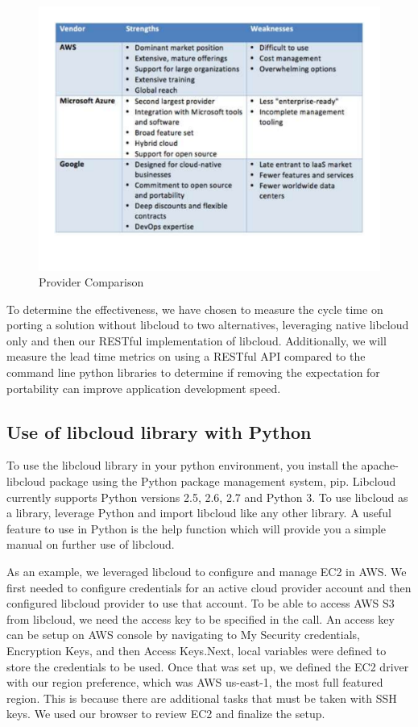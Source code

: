 \begin{figure}[!ht]
  \centering
  \includegraphics[width=\columnwidth]{images/aws-azure-google.pdf}
  \caption{Provider Comparison}\label{F:comparison}
\end{figure}

To determine the effectiveness, we have chosen to measure the cycle time on porting a 
solution without libcloud to two alternatives, leveraging native libcloud only and then 
our RESTful implementation of libcloud. Additionally, we will measure the lead time 
metrics on using a RESTful API compared to the command line python libraries to determine
if removing the expectation for portability can improve application development speed.

\subsection{Use of libcloud library with Python}

To use the libcloud library in your python environment, you install the apache-libcloud 
package using the Python package management system, pip. Libcloud currently supports Python
versions 2.5, 2.6, 2.7 and Python 3. To use libcloud as a library,
leverage Python and import libcloud like any other library. A useful feature to use in 
Python is the help function which will provide you a simple 
manual on further use of libcloud.

As an example, we leveraged libcloud to configure and manage EC2 in AWS. We first needed 
to configure credentials for an active cloud provider account and then configured 
libcloud provider to use that account. To be able to access AWS S3 from libcloud, we need 
the access key to be specified in the call. An access key can be setup on AWS console by 
navigating to My Security credentials, Encryption Keys, and then Access Keys.Next, local 
variables were defined to store the credentials to be used. Once that was set up, we 
defined the EC2  driver with our region preference, which was AWS us-east-1, the most 
full featured region. This is because there are additional tasks that must be taken with 
SSH keys. We used our browser to review EC2 and finalize the setup.

